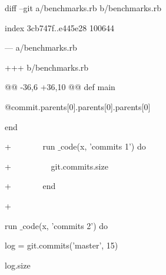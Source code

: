 diff --git a/benchmarks.rb b/benchmarks.rb \par
\noindent 
index 3cb747f..e445e28 100644 \par
\noindent 
--- a/benchmarks.rb \par
\noindent 
+++ b/benchmarks.rb \par
\noindent 
@@ -36,6 +36,10 @@ def main \par
\noindent 
@commit.parents[0].parents[0].parents[0] \par
\noindent 
end \par
\vspace{12pt}
\noindent 
+~~~~~~~ run $  \_  $code(x, 'commits 1') do \par
\noindent 
+~~~~~~~~~ git.commits.size \par
\noindent 
+~~~~~~~ end \par
\noindent 
+ \par
\noindent 
run $  \_  $code(x, 'commits 2') do \par
\noindent 
log = git.commits('master', 15) \par
\noindent 
log.size \par


